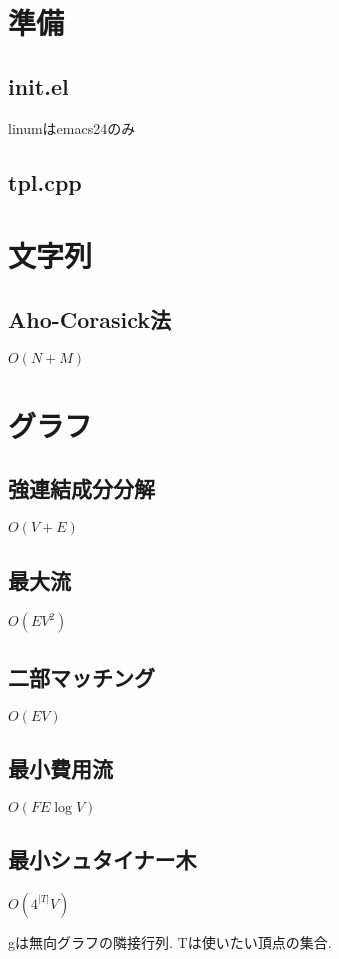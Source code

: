 \documentclass[10pt,twocolumn,a4j,landscape]{jsarticle}
\begin{document}
\tableofcontents
\newpage
%
%
\section{準備}
\subsection{init.el}
linumはemacs24のみ


\subsection{tpl.cpp}


\section{文字列}
\subsection{Aho-Corasick法}
$O(N+M)$\par


\section{グラフ}
\subsection{強連結成分分解}
$O(V+E)$\par


\subsection{最大流}
$O(EV^2)$\par


\subsection{二部マッチング}
$O(EV)$\par



\subsection{最小費用流}
$O(FE\log{V})$\par


\subsection{最小シュタイナー木}
$O(4^{|T|}V)$ \par
gは無向グラフの隣接行列. Tは使いたい頂点の集合.\par

\end{document}
